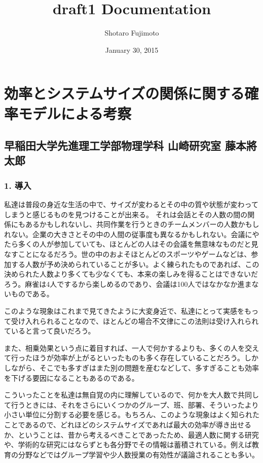 \documentclass[letterpaper,10pt,english]{sphinxmanual}
\title{draft1 Documentation}
\date{January 30, 2015}
\author{Shotaro Fujimoto}
\begin{document}
\maketitle
\tableofcontents
{}\label{index::doc}



\chapter{効率とシステムサイズの関係に関する確率モデルによる考察}
\label{draft::doc}\label{draft:id1}

\section{早稲田大学先進理工学部物理学科 山崎研究室 藤本將太郎}
\label{draft:id2}

\subsection{1. 導入}
\label{draft:id3}
私達は普段の身近な生活の中で、サイズが変わるとその中の質や状態が変わってしまうと感じるものを見つけることが出来る。
それは会話とその人数の間の関係にもあるかもしれないし、共同作業を行うときのチームメンバーの人数かもしれない。企業の大きさとその中の人間の従事度も異なるかもしれない。会議にやたら多くの人が参加していても、ほとんどの人はその会議を無意味なものだと見なすことになるだろう。世の中のおよそほとんどのスポーツやゲームなどは、参加する人数が予め決められていることが多い。よく練られたものであれば、この決められた人数より多くても少なくても、本来の楽しみを得ることはできないだろう。麻雀は4人でするから楽しめるのであり、会議は100人ではなかなか進まないものである。

このような現象はこれまで見てきたように大変身近で、私達にとって実感をもって受け入れられることなので、ほとんどの場合不文律にこの法則は受け入れられていると言って良いだろう。

また、相乗効果という点に着目すれば、一人で何かするよりも、多くの人を交えて行ったほうが効率が上がるといったものも多く存在していることだろう。しかしながら、そこでも多すぎはまた別の問題を産むなどして、多すぎることも効率を下げる要因になることもあるのである。

こういったことを私達は無自覚の内に理解しているので、何かを大人数で共同して行うときには、それをさらにいくつかのグループ、班、部署、そういったより小さい単位に分割する必要を感じる。もちろん、このような現象はよく知られたことであるので、どれほどのシステムサイズであれば最大の効率が導き出せるか、ということは、昔から考えるべきことであったため、最適人数に関する研究や、学術的な研究にはならずとも各分野でその情報は蓄積されている。例えば教育の分野などではグループ学習や少人数授業の有効性が議論されることも多い。
\end{document}
